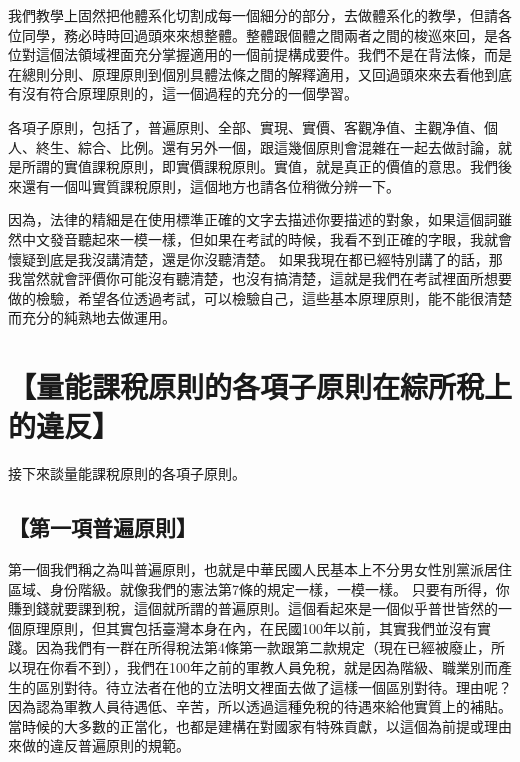 \documentclass[]{ctexbook}
\begin{document}
我們教學上固然把他體系化切割成每一個細分的部分，去做體系化的教學，但請各位同學，務必時時回過頭來來想整體。整體跟個體之間兩者之間的梭巡來回，是各位對這個法領域裡面充分掌握適用的一個前提構成要件。我們不是在背法條，而是在總則分則、原理原則到個別具體法條之間的解釋適用，又回過頭來來去看他到底有沒有符合原理原則的，這一個過程的充分的一個學習。

各項子原則，包括了，普遍原則、全部、實現、實價、客觀净值、主觀净值、個人、終生、綜合、比例。還有另外一個，跟這幾個原則會混雜在一起去做討論，就是所謂的實值課稅原則，即實價課稅原則。實值，就是真正的價值的意思。我們後來還有一個叫實質課稅原則，這個地方也請各位稍微分辨一下。

因為，法律的精細是在使用標準正確的文字去描述你要描述的對象，如果這個詞雖然中文發音聽起來一模一樣，但如果在考試的時候，我看不到正確的字眼，我就會懷疑到底是我沒講清楚，還是你沒聽清楚。
如果我現在都已經特別講了的話，那我當然就會評價你可能沒有聽清楚，也沒有搞清楚，這就是我們在考試裡面所想要做的檢驗，希望各位透過考試，可以檢驗自己，這些基本原理原則，能不能很清楚而充分的純熟地去做運用。

\hypertarget{ux91cfux80fdux8ab2ux7a05ux539fux5247ux7684ux5404ux9805ux5b50ux539fux5247ux5728ux7d9cux6240ux7a05ux4e0aux7684ux9055ux53cd}{%
\section{【量能課稅原則的各項子原則在綜所稅上的違反】}\label{ux91cfux80fdux8ab2ux7a05ux539fux5247ux7684ux5404ux9805ux5b50ux539fux5247ux5728ux7d9cux6240ux7a05ux4e0aux7684ux9055ux53cd}}

接下來談量能課稅原則的各項子原則。

\hypertarget{ux7b2cux4e00ux9805ux666eux904dux539fux5247}{%
\subsection{【第一項普遍原則】}\label{ux7b2cux4e00ux9805ux666eux904dux539fux5247}}

第一個我們稱之為叫普遍原則，也就是中華民國人民基本上不分男女性別黨派居住區域、身份階級。就像我們的憲法第7條的規定一樣，一模一樣。
只要有所得，你賺到錢就要課到稅，這個就所謂的普遍原則。這個看起來是一個似乎普世皆然的一個原理原則，但其實包括臺灣本身在內，在民國100年以前，其實我們並沒有實踐。因為我們有一群在所得稅法第4條第一款跟第二款規定（現在已經被廢止，所以現在你看不到），我們在100年之前的軍教人員免稅，就是因為階級、職業別而產生的區別對待。待立法者在他的立法明文裡面去做了這樣一個區別對待。理由呢？因為認為軍教人員待遇低、辛苦，所以透過這種免稅的待遇來給他實質上的補貼。當時候的大多數的正當化，也都是建構在對國家有特殊貢獻，以這個為前提或理由來做的違反普遍原則的規範。
\end{document}
